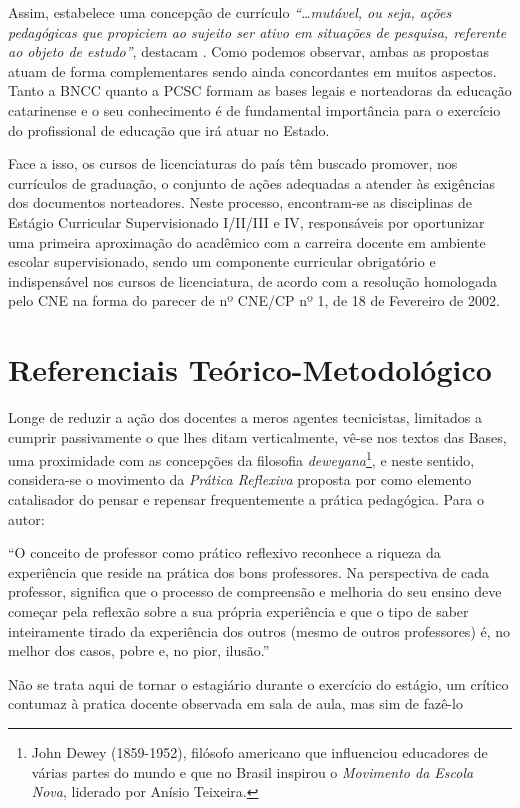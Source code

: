 Assim, estabelece uma concepção de currículo \emph{``\ldots mutável, ou seja, ações pedagógicas que propiciem ao sujeito ser ativo em situações de pesquisa, referente ao objeto de estudo''}, destacam \cite[p.~409]{COMIOTTO:2021}. Como podemos observar, ambas as propostas atuam de forma complementares sendo ainda concordantes em muitos aspectos. Tanto a \ac{BNCC} quanto a \ac{PCSC} formam as bases legais e norteadoras da educação catarinense e o seu conhecimento é de fundamental importância para o exercício do profissional de educação que irá atuar no Estado.

Face a isso, os cursos de licenciaturas do país têm buscado promover, nos currículos de graduação, o conjunto de ações adequadas a atender às exigências dos documentos norteadores. Neste processo, encontram-se as disciplinas de Estágio Curricular Supervisionado I/II/III e IV, responsáveis por oportunizar uma primeira aproximação do acadêmico com a carreira docente em ambiente escolar supervisionado, sendo um componente curricular obrigatório e indispensável nos cursos de licenciatura, de acordo com a resolução \cite{BRASIL:2002a} homologada pelo \ac{CNE} na forma do parecer de nº  CNE/CP nº 1, de 18 de Fevereiro de 2002.

\section{Referenciais Teórico-Metodológico}

Longe de reduzir a ação dos docentes a meros agentes tecnicistas, limitados a cumprir passivamente o que lhes ditam verticalmente, vê-se nos textos das Bases, uma proximidade com as concepções da filosofia \emph{deweyana}\footnote{John Dewey (1859-1952), filósofo americano que influenciou educadores de várias partes do mundo e que no Brasil inspirou o \emph{Movimento da Escola Nova}, liderado por Anísio Teixeira.}, e neste sentido, considera-se o movimento da \emph{Prática Reflexiva} proposta por \cite{ZEICHNER:1993} como elemento catalisador do pensar e repensar frequentemente a prática pedagógica. Para o autor:

\begin{citacao}
``O conceito de professor como prático reflexivo reconhece a riqueza da experiência que reside na prática dos bons professores. Na perspectiva de cada professor, significa que o processo de compreensão e melhoria do seu ensino deve começar pela reflexão sobre a sua própria experiência e que o tipo de saber inteiramente tirado da experiência dos outros (mesmo de outros professores) é, no melhor dos casos, pobre e, no pior, ilusão.'' 
\end{citacao}
Não se trata aqui de tornar o estagiário durante o exercício do estágio, um crítico contumaz à pratica docente observada em sala de aula, mas sim de fazê-lo

